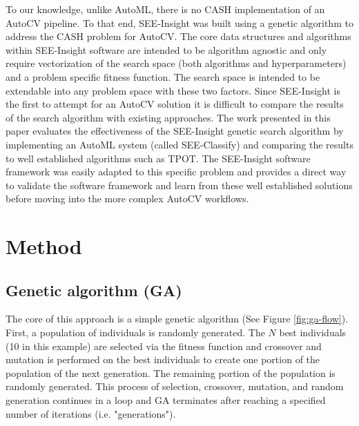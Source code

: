 \documentclass[acmsmall,screen]{acmart}
\begin{document}
To our knowledge, unlike AutoML,  there is no CASH implementation of an AutoCV pipeline. To that end, SEE-Insight was built using a genetic algorithm to address the CASH problem for AutoCV. The core data structures and algorithms within SEE-Insight software are intended to be algorithm agnostic and only require vectorization of the search space (both algorithms and hyperparameters) and a problem specific fitness function.  The search space is intended to be extendable into any problem space with these two factors. Since SEE-Insight is the first to attempt for an AutoCV solution it is difficult to compare the results of the search algorithm with existing approaches. The work presented in this paper evaluates the effectiveness of the SEE-Insight genetic search algorithm by implementing an AutoML system (called SEE-Classify) and comparing the results to well established algorithms such as TPOT. The SEE-Insight software framework was easily adapted to this specific problem and provides a direct way to validate the software framework and learn from these well established solutions before moving into the more complex AutoCV workflows.



\section{Method} 

\subsection{Genetic algorithm (GA)} The core of this approach is a simple genetic algorithm (See Figure \ref{fig:ga-flow}). First, a population of individuals is randomly generated. The $N$ best individuals (10 in this example) are selected via the fitness function and crossover and mutation is performed on the best individuals to create one portion of the population of the next generation. The remaining portion of the population is randomly generated. This process of selection, crossover, mutation, and random generation continues in a loop and GA terminates after reaching a specified number of iterations (i.e. "generations").
\end{document}
